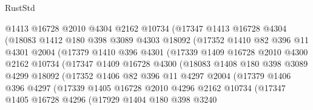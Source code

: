 \begin{lexlean}{RustStd}
\begin{coremodule}
                  @1413
                  @16728
                  @2010
                  @4304
                  @2162
                  @10734
                  (@17347
                    @1413
                    @16728
                    @4304
                    (@18083
                      @1412
                      @180
                      @398
                      @3089
                      @4303
                      @18092
                      (@17352
                        @1410
                        @82
                        @396
                        @11
                        @4301
                        @2004
                        (@17379
                          @1410
                          @396
                          @4301
                          (@17339
                            @1409
                            @16728
                            @2010
                            @4300
                            @2162
                            @10734
                            (@17347
                              @1409
                              @16728
                              @4300
                              (@18083
                                @1408
                                @180
                                @398
                                @3089
                                @4299
                                @18092
                                (@17352
                                  @1406
                                  @82
                                  @396
                                  @11
                                  @4297
                                  @2004
                                  (@17379
                                    @1406
                                    @396
                                    @4297
                                    (@17339
                                      @1405
                                      @16728
                                      @2010
                                      @4296
                                      @2162
                                      @10734
                                      (@17347
                                        @1405
                                        @16728
                                        @4296
                                        (@17929
                                          @1404
                                          @180
                                          @398
                                          @3240

\end{coremodule}
\end{lexlean}
